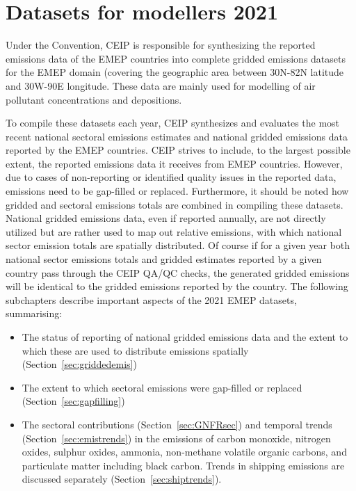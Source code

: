 \section{Datasets for modellers 2021}
\label{sec:modeldata}

Under the Convention, CEIP is responsible for synthesizing the reported emissions data of the EMEP countries into complete gridded emissions datasets for the EMEP domain (covering the geographic area between 30\degrees N-82\degrees N latitude and 30\degrees W-90\degrees E longitude. These data are mainly used for modelling of air pollutant concentrations and depositions.

To compile these datasets each year, CEIP synthesizes and evaluates the most recent national sectoral emissions estimates and national gridded emissions data reported by the EMEP countries. CEIP strives to include, to the largest possible extent, the reported emissions data it receives from EMEP countries. However, due to cases of non-reporting or identified quality issues in the reported data, emissions need to be gap-filled or replaced. Furthermore, it should be noted how gridded and sectoral emissions totals are combined in compiling these datasets. National gridded emissions data, even if reported annually, are not directly utilized but are rather used to map out relative emissions, with which national sector emission totals are spatially distributed. Of course if for a given year both national sector emissions totals and gridded estimates reported by a given country pass through the CEIP QA/QC checks, the generated gridded emissions will be identical to the gridded emissions reported by the country.
The following subchapters describe important aspects of the 2021 EMEP datasets, summarising:

\begin{itemize}
    \item The status of reporting of national gridded emissions data and the extent to which these are used to distribute emissions spatially (Section~\ref{sec:griddedemis})
    \item The extent to which sectoral emissions were gap-filled or replaced (Section~\ref{sec:gapfilling})
    \item  The sectoral contributions (Section~\ref{sec:GNFRsec}) and temporal trends (Section~\ref{sec:emistrends}) in the emissions of carbon monoxide, nitrogen oxides, sulphur oxides, ammonia, non-methane volatile organic carbons, and particulate matter including black carbon. Trends in shipping emissions are discussed separately (Section~\ref{sec:shiptrends}).     
\end{itemize}


